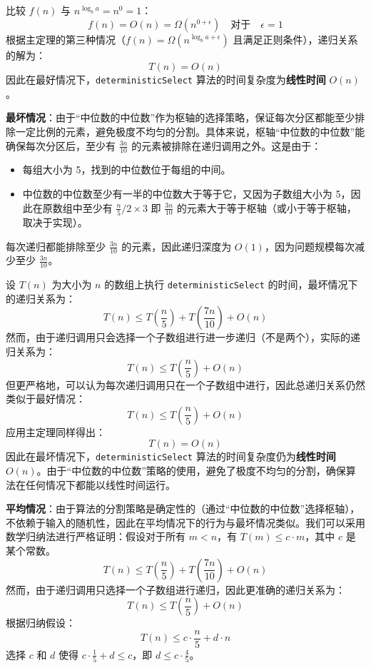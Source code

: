 比较 \( f(n) \) 与 \( n^{\log_b a} = n^0 = 1 \)：\[
f(n) = O(n) = \Omega(n^{0 + \epsilon}) \quad \text{对于} \quad \epsilon = 1
\]
根据主定理的第三种情况（\( f(n) = \Omega(n^{\log_b a + \epsilon}) \) 且满足正则条件），递归关系的解为：\[
T(n) = O(n)
\]
因此在最好情况下，\texttt{deterministicSelect} 算法的时间复杂度为\textbf{线性时间} \( O(n) \)。

\textbf{最坏情况}：由于``中位数的中位数''作为枢轴的选择策略，保证每次分区都能至少排除一定比例的元素，避免极度不均匀的分割。具体来说，枢轴``中位数的中位数''能确保每次分区后，至少有 \( \frac{3n}{10} \) 的元素被排除在递归调用之外。这是由于：\begin{itemize}
    \item 每组大小为 5，找到的中位数位于每组的中间。
    \item 中位数的中位数至少有一半的中位数大于等于它，又因为子数组大小为 5，因此在原数组中至少有 \( \frac{n}{5}/2\times 3\) 即 $\frac{3n}{10}$ 的元素大于等于枢轴（或小于等于枢轴，取决于实现）。
\end{itemize}

每次递归都能排除至少 \( \frac{3n}{10} \) 的元素，因此递归深度为 \( O(1) \)，因为问题规模每次减少至少 \( \frac{3n}{10} \)。

设 \( T(n) \) 为大小为 \( n \) 的数组上执行 \texttt{deterministicSelect} 的时间，最坏情况下的递归关系为：\[
T(n) \leq T\left(\frac{n}{5}\right) + T\left(\frac{7n}{10}\right) + O(n)
\]
然而，由于递归调用只会选择一个子数组进行进一步递归（不是两个），实际的递归关系为：\[
T(n) \leq T\left(\frac{n}{5}\right) + O(n)
\]
但更严格地，可以认为每次递归调用只在一个子数组中进行，因此总递归关系仍然类似于最好情况：\[
T(n) \leq T\left(\frac{n}{5}\right) + O(n)
\]
应用主定理同样得出：\[
T(n) = O(n)
\]
因此在最坏情况下，\texttt{deterministicSelect} 算法的时间复杂度仍为\textbf{线性时间} \( O(n) \)。由于``中位数的中位数''策略的使用，避免了极度不均匀的分割，确保算法在任何情况下都能以线性时间运行。

\textbf{平均情况}：由于算法的分割策略是确定性的（通过``中位数的中位数''选择枢轴），不依赖于输入的随机性，因此在平均情况下的行为与最坏情况类似。我们可以采用数学归纳法进行严格证明：假设对于所有 \( m < n \)，有 \( T(m) \leq c \cdot m \)，其中 \( c \) 是某个常数。
\[
T(n) \leq T\left(\frac{n}{5}\right) + T\left(\frac{7n}{10}\right) + O(n)
\]
然而，由于递归调用只选择一个子数组进行递归，因此更准确的递归关系为：
\[
T(n) \leq T\left(\frac{n}{5}\right) + O(n)
\]
根据归纳假设：
\[
T(n) \leq c \cdot \frac{n}{5} + d \cdot n
\]
选择 \( c \) 和 \( d \) 使得 \( c \cdot \frac{1}{5} + d \leq c \)，即 \( d \leq c \cdot \frac{4}{5} \)。

